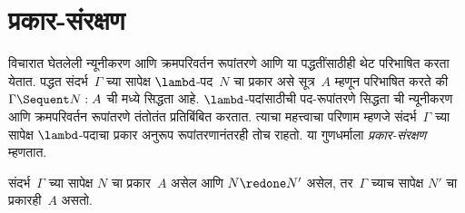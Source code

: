 \section{प्रकार-संरक्षण}\label{int:pty:tpr:sec}

विचारात घेतलेली न्यूनीकरण आणि क्रमपरिवर्तन रूपांतरणे
 आणि  या पद्धतींसाठीही थेट
परिभाषित करता येतात.  पद्धत संदर्भ~$\Gamma$
च्या सापेक्ष $\lambd$-पद~$N$ चा प्रकार असे
सूत्र~$A$ म्हणून परिभाषित करते की
$\Gamma \Sequent N : A$ ची  मध्ये
सिद्धता आहे. $\lambd$-पदांसाठीची
पद-रूपांतरणे सिद्धता ची न्यूनीकरण
आणि क्रमपरिवर्तन रूपांतरणे तंतोतंत प्रतिबिंबित करतात.
त्याचा महत्त्वाचा परिणाम म्हणजे संदर्भ~$\Gamma$ च्या
सापेक्ष $\lambd$-पदाचा प्रकार अनुरूप रूपांतरणानंतरही
तोच राहतो. या गुणधर्माला \emph{प्रकार-संरक्षण} म्हणतात.

\begin{prop}
संदर्भ~$\Gamma$ च्या सापेक्ष $N$ चा प्रकार~$A$
असेल आणि $N \redone N'$ असेल, तर~$\Gamma$ च्याच
सापेक्ष $N'$ चा प्रकारही~$A$ असतो.
\end{prop}

